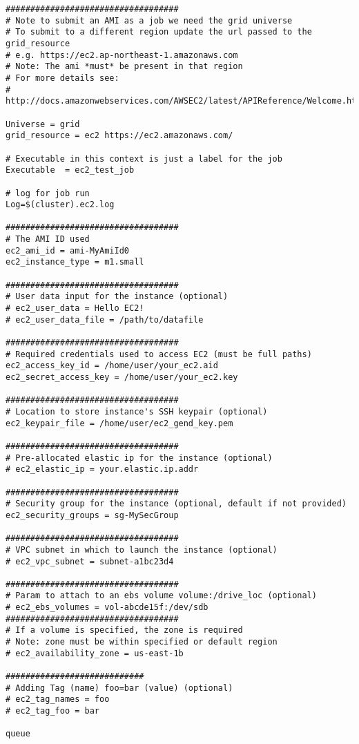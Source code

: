 \begin{verbatim}
###################################
# Note to submit an AMI as a job we need the grid universe
# To submit to a different region update the url passed to the grid_resource
# e.g. https://ec2.ap-northeast-1.amazonaws.com
# Note: The ami *must* be present in that region
# For more details see: 
# http://docs.amazonwebservices.com/AWSEC2/latest/APIReference/Welcome.html

Universe = grid
grid_resource = ec2 https://ec2.amazonaws.com/

# Executable in this context is just a label for the job
Executable  = ec2_test_job

# log for job run
Log=$(cluster).ec2.log

###################################
# The AMI ID used 
ec2_ami_id = ami-MyAmiId0
ec2_instance_type = m1.small

###################################
# User data input for the instance (optional)
# ec2_user_data = Hello EC2!
# ec2_user_data_file = /path/to/datafile

###################################
# Required credentials used to access EC2 (must be full paths)
ec2_access_key_id = /home/user/your_ec2.aid
ec2_secret_access_key = /home/user/your_ec2.key

###################################
# Location to store instance's SSH keypair (optional)
ec2_keypair_file = /home/user/ec2_gend_key.pem

###################################
# Pre-allocated elastic ip for the instance (optional)
# ec2_elastic_ip = your.elastic.ip.addr

###################################
# Security group for the instance (optional, default if not provided)
ec2_security_groups = sg-MySecGroup

###################################
# VPC subnet in which to launch the instance (optional)
# ec2_vpc_subnet = subnet-a1bc23d4

###################################
# Param to attach to an ebs volume volume:/drive_loc (optional)
# ec2_ebs_volumes = vol-abcde15f:/dev/sdb
###################################
# If a volume is specified, the zone is required
# Note: zone must be within specified or default region
# ec2_availability_zone = us-east-1b

############################
# Adding Tag (name) foo=bar (value) (optional)
# ec2_tag_names = foo
# ec2_tag_foo = bar 

queue
\end{verbatim}

